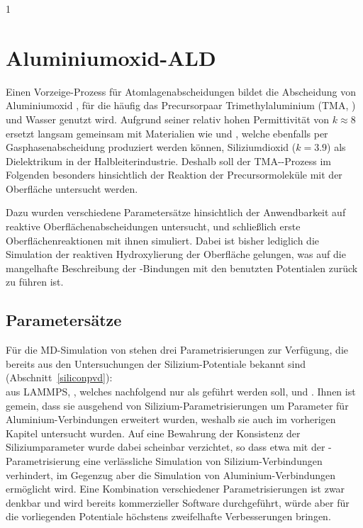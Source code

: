 1\section{Aluminiumoxid-ALD}
\label{aluminaald}

Einen Vorzeige-Prozess für Atomlagenabscheidungen bildet die Abscheidung von Aluminiumoxid \cite{puurunen_surface_2005}, für die häufig das Precursorpaar Trimethylaluminium (TMA, ) und Wasser genutzt wird.
Aufgrund seiner relativ hohen Permittivität von $k\approx 8$ ersetzt  langsam gemeinsam mit Materialien wie  und , welche ebenfalls per Gasphasenabscheidung produziert werden können\cite{smith_chemical_2000}, Siliziumdioxid ($k=3.9$) als Dielektrikum in der Halbleiterindustrie.
Deshalb soll der TMA--Prozess im Folgenden besonders hinsichtlich der Reaktion der Precursormoleküle mit der Oberfläche untersucht werden.

Dazu wurden verschiedene Parametersätze hinsichtlich der Anwendbarkeit auf reaktive Oberflächenabscheidungen untersucht, und schließlich erste Oberflächenreaktionen mit ihnen simuliert.
Dabei ist bisher lediglich die Simulation der reaktiven Hydroxylierung der Oberfläche gelungen, was auf die mangelhafte Beschreibung der -Bindungen mit den benutzten Potentialen zurück zu führen ist.

\subsection{Parametersätze}

Für die MD-Simulation von  stehen drei Parametrisierungen zur Verfügung, die bereits aus den Untersuchungen der Silizium-Potentiale bekannt sind (Abschnitt~\ref{siliconpvd}):\\
 aus LAMMPS\cite{plimpton_lammps_2014}, \cite{liu_development_2012}, welches nachfolgend nur als  geführt werden soll, und \cite{narayanan_reactive_2012}.
Ihnen ist gemein, dass sie ausgehend von Silizium-Parametrisierungen um Parameter für Aluminium-Verbindungen erweitert wurden, weshalb sie auch im vorherigen Kapitel untersucht wurden.
Auf eine Bewahrung der Konsistenz der Siliziumparameter wurde dabei scheinbar verzichtet, so dass etwa mit der -Parametrisierung eine verlässliche Simulation von Silizium-Verbindungen verhindert, im Gegenzug aber die Simulation von Aluminium-Verbindungen ermöglicht wird.
Eine Kombination verschiedener Parametrisierungen ist zwar denkbar und wird bereits kommerzieller Software durchgeführt\cite{biovia_materials_2014}, würde aber für die vorliegenden Potentiale höchstens zweifelhafte Verbesserungen bringen.

